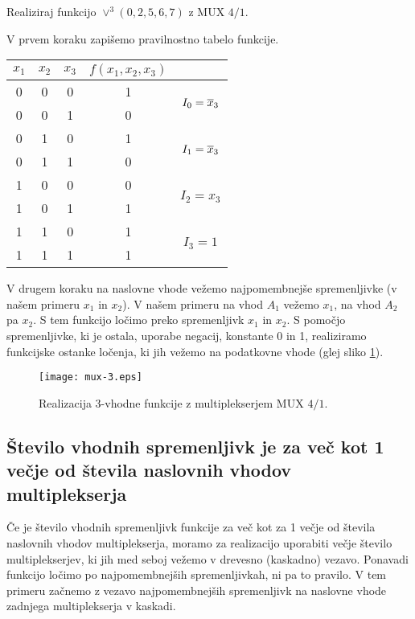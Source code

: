 \begin{zgled}
Realiziraj funkcijo $\vee^3(0,2,5,6,7)$ z MUX $4/1$.\\
\end{zgled}
\begin{resitev}

V prvem koraku zapišemo pravilnostno tabelo funkcije.

\bigskip
\begin{center}
\begin{tabular}{ccc|cc}
$x_1$ & $x_2$ & $x_3$ &  $f(x_1,x_2,x_3)$ \\
\hline
0 & 0 & 0 & 1 &\multirow{2}{*}{$I_0=\overline x_3$}\\
0 & 0 & 1 & 0 &\\ 
\hline
0 & 1 & 0 & 1 &\multirow{2}{*}{$I_1=\overline x_3$}\\
0 & 1 & 1 & 0 &\\
\hline
1 & 0 & 0 & 0 &\multirow{2}{*}{$I_2=x_3$}\\
1 & 0 & 1 & 1 &\\
\hline
1 & 1 & 0 & 1 &\multirow{2}{*}{$I_3=1$}\\
1 & 1 & 1 & 1 &\\
\end{tabular}
\end{center}

\bigskip

V drugem koraku na naslovne vhode vežemo najpomembnejše spremenljivke (v našem primeru $x_1$ in $x_2$). V našem primeru na vhod $A_1$ vežemo $x_1$, na vhod $A_2$ pa $x_2$. S tem funkcijo ločimo preko spremenljivk $x_1$ in $x_2$. S pomočjo spremenljivke, ki je ostala, uporabe negacij, konstante 0 in 1, realiziramo funkcijske ostanke ločenja, ki jih vežemo na podatkovne vhode (glej sliko \ref{fig:mux_zgled_2}).

\end{resitev}


\bigskip
\begin{figure}[ht]
\centering
\texttt{[image: mux-3.eps]}
\caption{Realizacija 3-vhodne funkcije z multiplekserjem MUX $4/1$.}
\label{fig:mux_zgled_2}
\end{figure}

\subsection{Število vhodnih spremenljivk je za več kot 1 večje od števila naslovnih vhodov multiplekserja}

Če je število vhodnih spremenljivk funkcije za več kot za 1 večje od števila naslovnih vhodov multiplekserja, moramo za realizacijo uporabiti večje število multiplekserjev, ki jih med seboj vežemo v drevesno (kaskadno) vezavo. Ponavadi funkcijo ločimo po najpomembnejših spremenljivkah, ni pa to pravilo. V tem primeru začnemo z vezavo najpomembnejših spremenljivk na naslovne vhode zadnjega multiplekserja v kaskadi.

